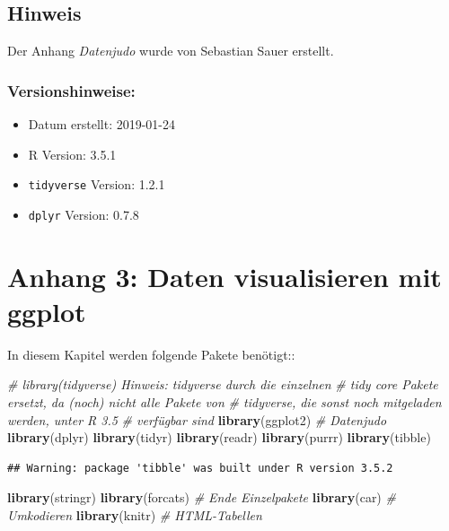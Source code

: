 \documentclass[12pt,ngerman,paper=a4,pagesize,DIV=13]{scrreprt}
\newenvironment{Shaded}{\begin{snugshade}}{\end{snugshade}}
\newcommand{\CommentTok}[1]{\textcolor[rgb]{0.56,0.35,0.01}{\textit{#1}}}
\newcommand{\KeywordTok}[1]{\textcolor[rgb]{0.13,0.29,0.53}{\textbf{#1}}}
\newcommand{\NormalTok}[1]{#1}
\providecommand{\tightlist}{%
  \setlength{\itemsep}{0pt}\setlength{\parskip}{0pt}}
\begin{document}
\hypertarget{hinweis}{%
\section{Hinweis}\label{hinweis}}

Der Anhang \emph{Datenjudo} wurde von Sebastian Sauer erstellt.

\hypertarget{versionshinweise-7}{%
\subsection{Versionshinweise:}\label{versionshinweise-7}}

\begin{itemize}
\tightlist
\item
  Datum erstellt: 2019-01-24
\item
  R Version: 3.5.1
\item
  \texttt{tidyverse} Version: 1.2.1
\item
  \texttt{dplyr} Version: 0.7.8
\end{itemize}

\hypertarget{anhang-3-daten-visualisieren-mit-ggplot}{%
\chapter{Anhang 3: Daten visualisieren mit
ggplot}\label{anhang-3-daten-visualisieren-mit-ggplot}}

In diesem Kapitel werden folgende Pakete benötigt::

\begin{Shaded}
\begin{Highlighting}[]
\CommentTok{# library(tidyverse) Hinweis: tidyverse durch die einzelnen}
\CommentTok{# tidy core Pakete ersetzt, da (noch) nicht alle Pakete von}
\CommentTok{# tidyverse, die sonst noch mitgeladen werden, unter R 3.5}
\CommentTok{# verfügbar sind}
\KeywordTok{library}\NormalTok{(ggplot2)  }\CommentTok{# Datenjudo}
\KeywordTok{library}\NormalTok{(dplyr)}
\KeywordTok{library}\NormalTok{(tidyr)}
\KeywordTok{library}\NormalTok{(readr)}
\KeywordTok{library}\NormalTok{(purrr)}
\KeywordTok{library}\NormalTok{(tibble)}
\end{Highlighting}
\end{Shaded}

\begin{verbatim}
## Warning: package 'tibble' was built under R version 3.5.2
\end{verbatim}

\begin{Shaded}
\begin{Highlighting}[]
\KeywordTok{library}\NormalTok{(stringr)}
\KeywordTok{library}\NormalTok{(forcats)  }\CommentTok{# Ende Einzelpakete}
\KeywordTok{library}\NormalTok{(car)  }\CommentTok{# Umkodieren}
\KeywordTok{library}\NormalTok{(knitr)  }\CommentTok{# HTML-Tabellen}
\end{Highlighting}
\end{Shaded}
\end{document}
